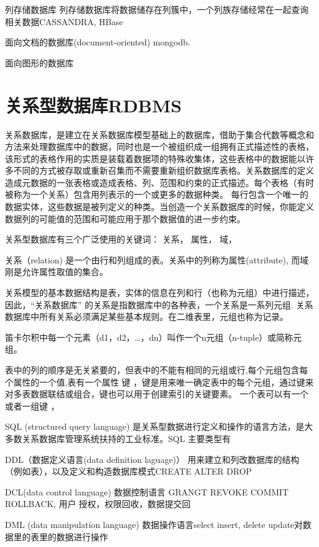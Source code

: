 列存储数据库 列存储数据库将数据储存在列簇中，一个列族存储经常在一起查询相关数据CASSANDRA, HBase

面向文档的数据库(document-oriented) mongodb.

面向图形的数据库


\section{关系型数据库RDBMS}

关系数据库，是建立在关系数据库模型基础上的数据库，借助于集合代数等概念和方法来处理数据库中的数据，同时也是一个被组织成一组拥有正式描述性的表格，该形式的表格作用的实质是装载着数据项的特殊收集体，这些表格中的数据能以许多不同的方式被存取或重新召集而不需要重新组织数据库表格。关系数据库的定义造成元数据的一张表格或造成表格、列、范围和约束的正式描述。每个表格（有时被称为一个关系）包含用列表示的一个或更多的数据种类。 每行包含一个唯一的数据实体，这些数据是被列定义的种类。当创造一个关系数据库的时候，你能定义数据列的可能值的范围和可能应用于那个数据值的进一步约束。

关系型数据库有三个广泛使用的关键词： 关系， 属性， 域， 

关系（relation) 是一个由行和列组成的表。关系中的列称为属性(attribute), 而域刚是允许属性取值的集合。

关系模型的基本数据结构是表，实体的信息在列和行（也称为元组）中进行描述，因此，“关系数据库” 的关系是指数据库中的各种表，一个关系是一系列元组. 关系数据库中所有关系必须满足某些基本规则。在二维表里，元组也称为记录。

笛卡尔积中每一个元素（d1，d2，…，dn）叫作一个n元组（n-tuple）或简称元组。

表中的列的顺序是无关紧要的，但表中的不能有相同的元组或行,每个元组包含每个属性的一个值,表有一个属性 键 ，键是用来唯一确定表中的每个元组，通过键来对多表数据联结或组合，键也可以用于创建索引的关键要素。 一个表可以有一个或者一组键 ， 

SQL (structured query language) 是关系型数据进行定义和操作的语言方法，是大多数关系数据库管理系统扶持的工业标准。SQL 主要类型有

DDL（数据定义语言(data definition laguage)） 用来建立和列改数据库的结构（例如表），以及定义和构造数据库模式CREATE ALTER DROP 

DCL(data control language) 数据控制语言 GRANGT REVOKE COMMIT ROLLBACK, 用户 授权，权限回收，数据提交回

DML (data manipulation language) 数据操作语言select insert, delete update对数据里的表里的数据进行操作



